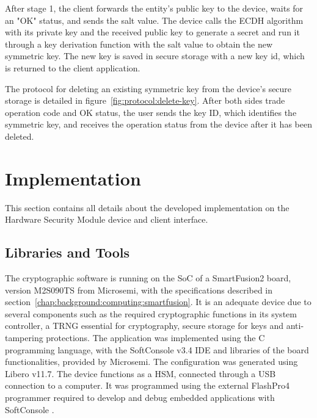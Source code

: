 After stage 1, the client forwards the entity's public key to the device, waits for an "OK" status, and sends the salt value. The device calls the ECDH algorithm with its private key and the received public key to generate a secret and run it through a key derivation function with the salt value to obtain the new symmetric key.
The new key is saved in secure storage with a new key id, which is returned to the client application.

The protocol for deleting an existing symmetric key from the device's secure storage is detailed in figure~\ref{fig:protocol:delete-key}.
After both sides trade operation code and OK status, the user sends the key ID, which identifies the symmetric key, and receives the operation status from the device after it has been deleted.

\section{Implementation}\label{chap:implementation:app}

This section contains all details about the developed implementation on the Hardware Security Module device and client interface.

\subsection{Libraries and Tools}\label{chap:implementation:app:tools}

The cryptographic software is running on the \ac{SoC} of a SmartFusion2 board, version M2S090TS from Microsemi, with the specifications described in section~\ref{chap:background:computing:smartfusion}. It is an adequate device due to several components such as the required cryptographic functions in its system controller, a \ac{TRNG} essential for cryptography, secure storage for keys and anti-tampering protections.
The application was implemented using the C programming language, with the SoftConsole v3.4 \ac{IDE} and libraries of the board functionalities, provided by Microsemi. The configuration was generated using Libero v11.7.
The device functions as a \ac{HSM}, connected through a \ac{USB} connection to a computer. It was programmed using the external FlashPro4 programmer required to develop and debug embedded applications with SoftConsole \cite{smartfusionSecurityPractices}.

